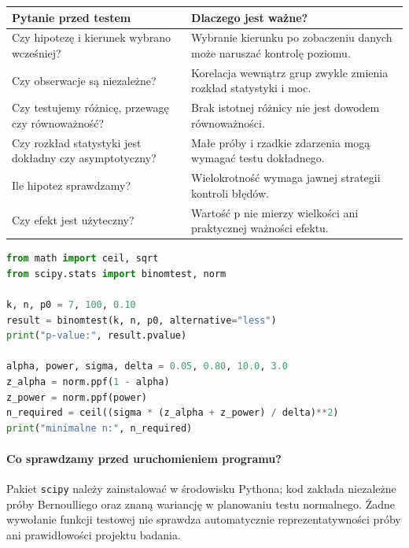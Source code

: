 \documentclass[11pt,a4paper,oneside]{report}
\numberwithin{equation}{chapter}
\theoremstyle{plain}
\theoremstyle{definition}
\theoremstyle{remark}
\begin{document}
\begin{center}\small
\begin{tabular}{>{\raggedright\arraybackslash}p{}>{\raggedright\arraybackslash}p{}}
\toprule
\textbf{Pytanie przed testem} & \textbf{Dlaczego jest ważne?}\\
\midrule
Czy hipotezę i kierunek wybrano wcześniej? & Wybranie kierunku po zobaczeniu danych może naruszać kontrolę poziomu.\\
Czy obserwacje są niezależne? & Korelacja wewnątrz grup zwykle zmienia rozkład statystyki i moc.\\
Czy testujemy różnicę, przewagę czy równoważność? & Brak istotnej różnicy nie jest dowodem równoważności.\\
Czy rozkład statystyki jest dokładny czy asymptotyczny? & Małe próby i rzadkie zdarzenia mogą wymagać testu dokładnego.\\
Ile hipotez sprawdzamy? & Wielokrotność wymaga jawnej strategii kontroli błędów.\\
Czy efekt jest użyteczny? & Wartość p nie mierzy wielkości ani praktycznej ważności efektu.\\
\bottomrule
\end{tabular}
\end{center}

\begin{lstlisting}[language=Python,caption={Dokładny test dwumianowy i obliczenie mocy testu normalnego.}]
from math import ceil, sqrt
from scipy.stats import binomtest, norm

k, n, p0 = 7, 100, 0.10
result = binomtest(k, n, p0, alternative="less")
print("p-value:", result.pvalue)

alpha, power, sigma, delta = 0.05, 0.80, 10.0, 3.0
z_alpha = norm.ppf(1 - alpha)
z_power = norm.ppf(power)
n_required = ceil((sigma * (z_alpha + z_power) / delta)**2)
print("minimalne n:", n_required)
\end{lstlisting}

\paragraph{Co sprawdzamy przed uruchomieniem programu?}
Pakiet \texttt{scipy} należy zainstalować w środowisku Pythona;
kod zakłada niezależne próby Bernoulliego oraz znaną wariancję
w planowaniu testu normalnego. Żadne wywołanie funkcji testowej
nie sprawdza automatycznie reprezentatywności próby ani
prawidłowości projektu badania.


\end{document}
